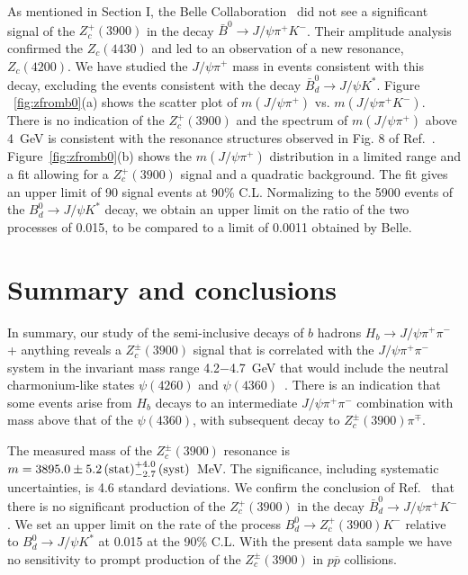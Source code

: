 \documentclass[aps,prd,twocolumn,superscriptaddress,groupedaddress,floatfix]{revtex4}
\begin{document}
 As mentioned in Section I, the Belle Collaboration~\cite{belle2} did not see a significant signal
of the  $Z_c^+(3900)$ in the decay $\bar B^0 \rightarrow J/\psi \pi^+ K^-$. Their amplitude
analysis confirmed the $Z_c(4430)$ and led to an observation of a new resonance, $Z_c(4200)$.
We have studied the $J/\psi \pi^+$ mass in events consistent with this decay,
excluding the events consistent with the decay $\bar B^0_d \rightarrow J/\psi K^*$. 
Figure ~\ref{fig:zfromb0}(a) shows the scatter plot of $m(J/\psi \pi^+)$ vs.  $m(J/\psi \pi^+ K^-)$. 
There is no indication of the   $Z_c^+(3900)$ and the spectrum of   $m(J/\psi \pi^+)$ above 4~GeV
is consistent with the resonance structures observed in Fig. 8 of  Ref.~\cite{belle2}.
Figure~\ref{fig:zfromb0}(b) shows the  $m(J/\psi \pi^+)$ distribution in a limited range
and a fit allowing for a  $Z_c^+(3900)$ signal and a quadratic background.
The fit  gives  an upper limit of 90 signal events at 90\% C.L.
Normalizing to the  5900 events of the $B_d^0 \rightarrow J/\psi K^*$ decay,
we obtain an upper limit on the ratio of the two processes of 0.015,
to be compared to  a limit of 0.0011 obtained by Belle.
 




\section{Summary and conclusions}



In summary, our study of the semi-inclusive decays of $b$ hadrons 
 $H_b \rightarrow J/\psi  \pi^+  \pi^-$ + anything  reveals a $Z_c^{\pm}(3900)$
signal  that  is correlated with the  $J/\psi \pi^+ \pi^-$ system
in the invariant mass range 4.2$-$4.7~GeV that would  include 
the neutral charmonium-like states $\psi(4260)$ and $\psi(4360)$~\cite{pdg}.
There is an indication that some events arise from $H_b$  decays to an intermediate
 $J/\psi \pi^+ \pi^-$  combination with mass above that of the $\psi(4360)$, with subsequent decay to
$Z_c^{\pm}(3900) \pi^{\mp}$. 



The measured mass of the  $Z_c^{\pm}(3900)$ resonance is
$m=3895.0\pm5.2 {\rm \thinspace (stat)} ^{+4.0}_{-2.7}{\rm \thinspace (syst)}$~MeV.
The significance, including  systematic uncertainties, is 4.6 standard deviations. 
We confirm the conclusion of  Ref.~\cite{belle2} that there is no significant
production of the $Z_c^+(3900)$ in the decay $\bar B^0_d \rightarrow J/\psi \pi^+ K^-$.
We set an upper  limit on  the rate of the process $B^0_d \rightarrow Z_c^+(3900) K^-$ 
relative to  $B_d^0 \rightarrow J/\psi K^*$ at 0.015 at the 90\% C.L.
With the present data sample  we have no sensitivity to  prompt production of the  $Z_c^{\pm}(3900)$ 
in $p \overline p$ collisions.
\end{document}
